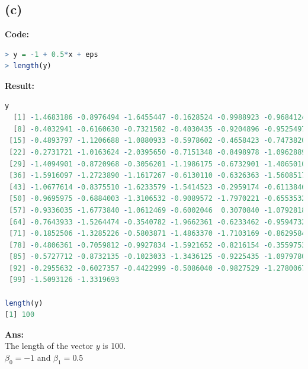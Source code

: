 \documentclass[twoside]{homework}
\begin{document}
\subsection*{(c)}
\textbf{Code:}
\begin{lstlisting}[language=R]
> y = -1 + 0.5*x + eps
> length(y)
\end{lstlisting}
\textbf{Result:}
\begin{lstlisting}[language=R]
y
  [1] -1.4683186 -0.8976494 -1.6455447 -0.1628524 -0.9988923 -0.9684124 -0.5771086
  [8] -0.4032941 -0.6160630 -0.7321502 -0.4030435 -0.9204896 -0.9525497 -2.2700240
 [15] -0.4893797 -1.1206688 -1.0880933 -0.5978602 -0.4658423 -0.7473820 -0.6670007
 [22] -0.2731721 -1.0163624 -2.0395650 -0.7151348 -0.8498978 -1.0962889 -1.7447847
 [29] -1.4094901 -0.8720968 -0.3056201 -1.1986175 -0.6732901 -1.4065010 -1.6118903
 [36] -1.5916097 -1.2723890 -1.1617267 -0.6130110 -0.6326363 -1.5608517 -0.8325350
 [43] -1.0677614 -0.8375510 -1.6233579 -1.5414523 -0.2959174 -0.6113846 -1.3777482
 [50] -0.9695975 -0.6884003 -1.3106532 -0.9089572 -1.7970221 -0.6553532 -0.2785981
 [57] -0.9336035 -1.6773840 -1.0612469 -0.6002046  0.3070840 -1.0792818 -0.3905096
 [64] -0.7643933 -1.5264474 -0.3540782 -1.9662361 -0.6233462 -0.9594732  0.1381904
 [71] -0.1852506 -1.3285226 -0.5803871 -1.4863370 -1.7103169 -0.8629584 -1.0247360
 [78] -0.4806361 -0.7059812 -0.9927834 -1.5921652 -0.8216154 -0.3559753 -2.1285959
 [85] -0.5727712 -0.8732135 -0.1023033 -1.3436125 -0.9225435 -1.0979780 -1.3155360
 [92] -0.2955632 -0.6027357 -0.4422999 -0.5086040 -0.9827529 -1.2780067 -1.5405946
 [99] -1.5093126 -1.3319693

length(y)
[1] 100
\end{lstlisting}
\textbf{Ans:}\\
The length of the vector $y$ is 100.\\
$\beta_0 = -1$ and $\beta_1 = 0.5$
\end{document}
